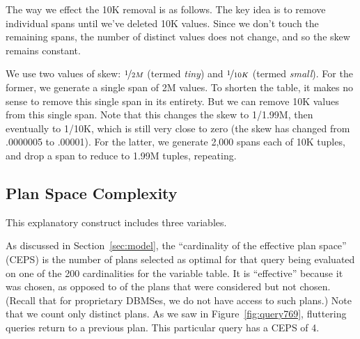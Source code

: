 \documentclass[prodmode,acmtods]{acmsmall}
\begin{document}
The way we effect the 10K removal is as follows. 
The key idea is to remove individual spans until we've deleted 10K
values. Since we don't touch the remaining spans, the number of distinct
values does not change, and so the skew remains constant.

We use two values of skew: $\nicefrac{1}{2M}$ (termed {\em tiny}) and
$\nicefrac{1}{10K}$ (termed {\em small}).
For the former, we generate a single span of 2M values.  To shorten the
table, it makes no sense to remove this single span in its entirety. But we
can remove 10K values from this single span.  Note that this changes the
skew to 1/1.99M, then eventually to 1/10K, which is still very close to zero
(the skew has changed from .0000005 to .00001).
For the latter, we generate 2,000 spans each of 10K tuples, and drop a span
to reduce to 1.99M tuples, repeating.

\subsection{Plan Space Complexity}\label{sec:discontinuity}

This explanatory construct includes three variables.

As discussed in Section~\ref{sec:model}, the ``cardinality of the effective plan
space'' (CEPS) is the number of plans selected as optimal for that query
being evaluated on one of the 200 cardinalities for the variable table. It
is ``effective'' because it was chosen, as opposed to of the
plans that were considered but not chosen. (Recall that for proprietary
\hbox{DBMSes}, we do not have access to such plans.) Note that we count only
distinct plans. As we saw in Figure~\ref{fig:query769}, fluttering queries
return to a previous plan. This particular query has a CEPS of 4.
\end{document}
